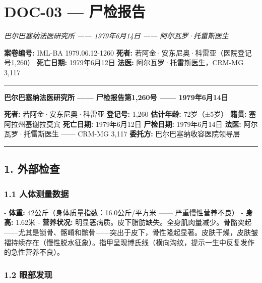 \section*{\textbf{DOC-03} --- 尸检报告}

\noindent \textit{巴尔巴塞纳法医研究所 —— 1979年6月14日 —— 阿尔瓦罗·托雷斯医生}

\noindent \textbf{案卷编号:} IML-BA 1979.06.12-1260
\textbf{死者:} 若阿金·安东尼奥·科雷亚（医院登记号1,260）
\textbf{死亡日期:} 1979年6月12日
\textbf{法医:} 阿尔瓦罗·托雷斯医生，CRM-MG 3,117

\vspace{0.5em}\noindent\rule{\textwidth}{0.5pt}\vspace{0.5em}

\noindent \textbf{巴尔巴塞纳法医研究所 —— 尸检报告第1,260号 —— 1979年6月14日}

\noindent \textbf{死者:} 若阿金·安东尼奥·科雷亚
\textbf{登记号:} 1,260
\textbf{估计年龄:} 72岁（±5岁）
\textbf{籍贯:} 塞阿拉州基谢拉莫宾
\textbf{死亡日期:} 1979年6月12日
\textbf{尸检日期:} 1979年6月14日
\textbf{法医:} 阿尔瓦罗·托雷斯医生 —— CRM-MG 3,117
\textbf{委托方:} 巴尔巴塞纳收容医院领导层

\vspace{0.5em}\noindent\rule{\textwidth}{0.5pt}\vspace{0.5em}

\subsection*{1. 外部检查}

\subsubsection*{1.1 人体测量数据}

\noindent - \textbf{体重:} 42公斤（身体质量指数：16.0公斤/平方米 —— 严重慢性营养不良）
- \textbf{身高:} 1.62米
- \textbf{营养状况:} 明显恶病质。皮下脂肪缺失。全身肌肉量减少。骨骼突起——尤其是锁骨、髂嵴和髌骨——突出于皮下，骨性隆起显著。皮肤干燥，皮肤皱褶持续存在（慢性脱水征象）。指甲呈现博氏线（横向沟纹，提示一生中反复发作的急性营养不良）。

\subsubsection*{1.2 眼部发现}

